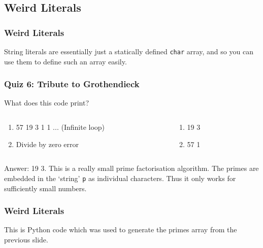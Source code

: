 \documentclass[xcolor]{beamer}
\begin{document}
\subsection{Weird Literals}

\begin{frame}
	\frametitle{Weird Literals}
	\pause
	
	String literals are essentially just a statically defined \texttt{char} array, and so you can use them to define such an array easily.
\end{frame}

\begin{frame}
	\frametitle{Quiz 6: Tribute to Grothendieck}
	\pause
	
	What does this code print?
	\pause
	
	
	\pause
	
	\begin{columns}
		\begin{column}{0.45\textwidth}
			\begin{enumerate}
				\footnotesize
				\item 57 19 3 1 1 ... (Infinite loop)
				\pause
				\item Divide by zero error
			\end{enumerate}
		\end{column}
		\pause
		\begin{column}{0.45\textwidth}
			\begin{enumerate}
				\footnotesize
				\setcounter{enumi}{2}
				\item 19 3
				\pause
				\item 57 1
			\end{enumerate}
		\end{column}
	\end{columns}
	\pause
	
	\vspace{0.2cm}
	
	\footnotesize
	Answer: 19 3. \pause This is a really small prime factorisation algorithm. \pause The primes are embedded in the `string' \texttt{p} as individual characters. \pause Thus it only works for sufficiently small numbers.
\end{frame}

\begin{frame}
	\frametitle{Weird Literals}
	\pause
	
	This is Python code which was used to generate the primes array from the previous slide.
	\pause
	
	
\end{frame}
\end{document}
